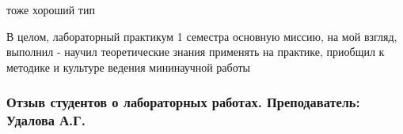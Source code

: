             \begin{commentbox} 
                тоже хороший тип 
            \end{commentbox} 
        
            \begin{commentbox} 
                В целом, лабораторный практикум 1 семестра основную миссию, на мой взгляд, выполнил - научил теоретические знания применять на практике, приобщил к методике и культуре ведения мининаучной работы  
            \end{commentbox}


    \subsubsection{Отзыв студентов о лабораторных работах. Преподаватель: Удалова А.Г.}
